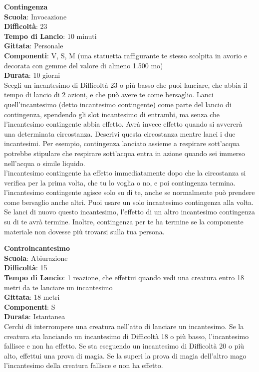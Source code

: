 \begin{multicols}{2}
\medskip\textbf{Contingenza}\\
\textbf{Scuola}: Invocazione\\
\textbf{Difficoltà}:  23\\
\textbf{Tempo di Lancio}: 10 minuti\\
\textbf{Gittata}: Personale\\
\textbf{Componenti}: V, S, M (una statuetta raffigurante te stesso scolpita in avorio e decorata con gemme del valore di almeno 1.500 mo)\\
\textbf{Durata}: 10 giorni\\
Scegli un incantesimo di Difficoltà 23 o più basso che puoi lanciare, che abbia il tempo di lancio di 2 azioni, e che può avere te come bersaglio. Lanci quell'incantesimo (detto incantesimo contingente) come parte del lancio di contingenza, spendendo gli slot incantesimo di entrambi, ma senza che l'incantesimo contingente abbia effetto. Avrà invece effetto quando si avvererà una determinata circostanza. Descrivi questa circostanza mentre lanci i due incantesimi. Per esempio, contingenza lanciato assieme a respirare sott’acqua potrebbe stipulare che respirare sott’acqua entra in azione quando sei immerso nell'acqua o simile liquido.\\
l'incantesimo contingente ha effetto immediatamente dopo che la circostanza si verifica per la prima volta, che tu lo voglia o no, e poi contingenza termina. l'incantesimo contingente agisce solo su di te, anche se normalmente può prendere come bersaglio anche altri. Puoi usare un solo incantesimo contingenza alla volta. Se lanci di nuovo questo incantesimo, l’effetto di un altro incantesimo contingenza su di te avrà termine. Inoltre, contingenza per te ha termine se la componente materiale non dovesse più trovarsi sulla tua persona.


\medskip\textbf{Controincantesimo}\\
\textbf{Scuola}: Abiurazione\\
\textbf{Difficoltà}:  15\\
\textbf{Tempo di Lancio}: 1 reazione, che effettui quando vedi una creatura entro 18 metri da te lanciare un incantesimo\\
\textbf{Gittata}: 18 metri\\
\textbf{Componenti}: S \\
\textbf{Durata}: Istantanea\\
Cerchi di interrompere una creatura nell'atto di lanciare un incantesimo. Se la creatura sta lanciando un incantesimo di Difficoltà 18 o più basso, l'incantesimo fallisce e non ha effetto. Se sta eseguendo un incantesimo di Difficoltà 20 o più alto, effettui una prova di magia.
Se la superi la prova di magia dell'altro mago l'incantesimo della creatura fallisce e non ha effetto. 



\end{multicols}
